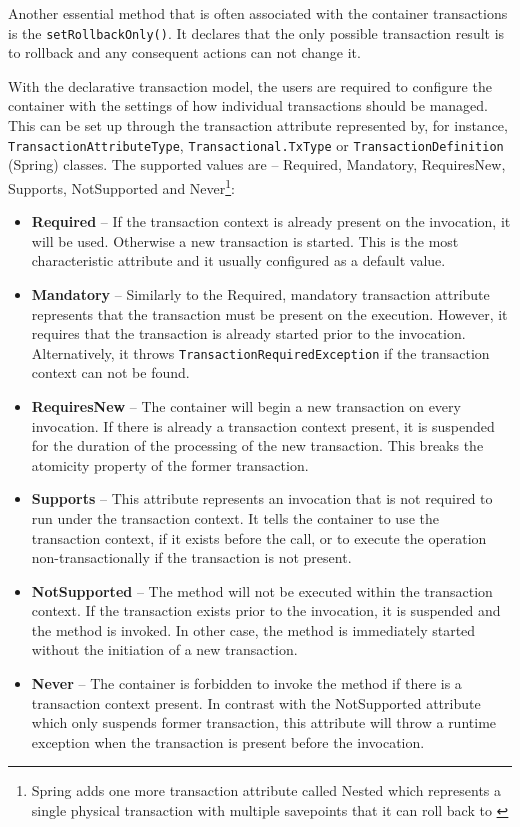 \documentclass[oneside,
  digital, %
  table,   %
  nolof,     %
  nolot,     %
]{fithesis3}
\begin{document}
Another essential method that is often associated with the container transactions is the \texttt{setRollbackOnly()}. It declares that the only possible transaction result is to rollback and any consequent actions can not change it.

With the declarative transaction model, the users are required to configure the container with the settings of how individual transactions should be managed. This can be set up through the transaction attribute represented by, for instance, \texttt{TransactionAttributeType}, \texttt{Transactional.TxType} or \texttt{TransactionDefinition} (Spring) classes. The supported values are -- Required, Mandatory, RequiresNew, Supports, NotSupported and Never\footnote{Spring adds one more transaction attribute called Nested which represents a single physical transaction with multiple savepoints that it can roll back to \cite{spring_transaction_management_documentation}}:

\begin{itemize}
    \item \textbf{Required} -- If the transaction context is already present on the invocation, it will be used. Otherwise a new transaction is started. This is the most characteristic attribute and it usually configured as a default value.
    
    \item \textbf{Mandatory} -- Similarly to the Required, mandatory transaction attribute represents that the transaction must be present on the execution. However, it requires that the transaction is already started prior to the invocation. Alternatively, it throws \texttt{TransactionRequiredException} if the transaction context can not be found.
    
    \item \textbf{RequiresNew} -- The container will begin a new transaction on every invocation. If there is already a transaction context present, it is suspended for the duration of the processing of the new transaction. This breaks the atomicity property of the former transaction.
    
    \item \textbf{Supports} -- This attribute represents an invocation that is not required to run under the transaction context. It tells the container to use the transaction context, if it exists before the call, or to execute the operation non-transactionally if the transaction is not present.
    
    \item \textbf{NotSupported} -- The method will not be executed within the transaction context. If the transaction exists prior to the invocation, it is suspended and the method is invoked. In other case, the method is immediately started without the initiation of a new transaction.
    
    \item \textbf{Never} -- The container is forbidden to invoke the method if there is a transaction context present. In contrast with the NotSupported attribute which only suspends former transaction, this attribute will throw a runtime exception when the transaction is present before the invocation.
\end{itemize}
\end{document}

